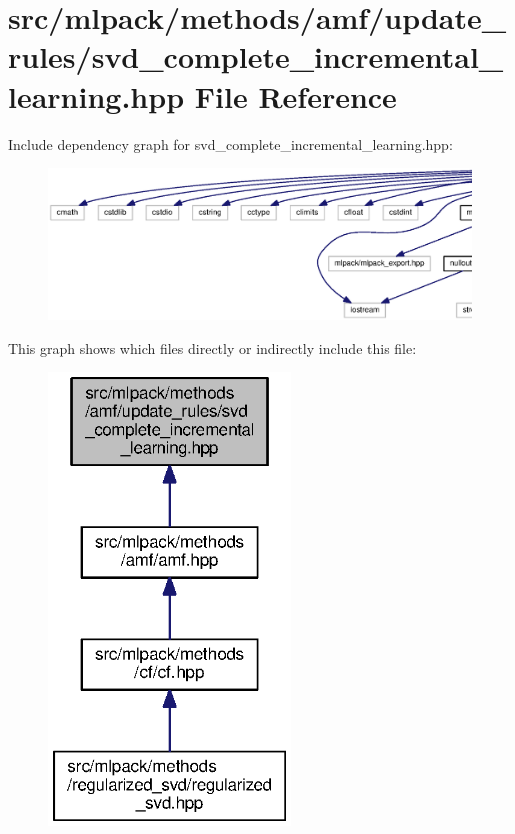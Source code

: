 \section{src/mlpack/methods/amf/update\+\_\+rules/svd\+\_\+complete\+\_\+incremental\+\_\+learning.hpp File Reference}
\label{svd__complete__incremental__learning_8hpp}
Include dependency graph for svd\+\_\+complete\+\_\+incremental\+\_\+learning.\+hpp\+:
\nopagebreak
\begin{figure}[H]
\begin{center}
\leavevmode
\includegraphics[width=350pt]{svd__complete__incremental__learning_8hpp__incl}
\end{center}
\end{figure}
This graph shows which files directly or indirectly include this file\+:
\nopagebreak
\begin{figure}[H]
\begin{center}
\leavevmode
\includegraphics[width=182pt]{svd__complete__incremental__learning_8hpp__dep__incl}
\end{center}
\end{figure}
